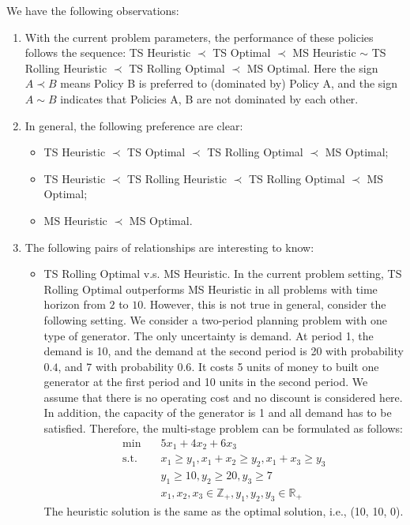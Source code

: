 \documentclass[10pt]{article}
\theoremstyle{plain}
\theoremstyle{definition}
\theoremstyle{remark}
\newcommand{\Z}{\mathbb{Z}}
\newcommand{\R}{\mathbb{R}}
\begin{document}
We have the following observations:
\begin{enumerate}[label=\emph{\alph*)}]
\item With the current problem parameters, the performance of these policies follows the sequence:
{\color{rred}TS Heuristic $\prec$ TS Optimal $\prec$ MS Heuristic $\sim$ TS Rolling Heuristic $\prec$ TS Rolling Optimal $\prec$ MS Optimal}.
Here the sign $A \prec B$ means Policy B is preferred to (dominated by) Policy A,
and the sign $A \sim B$ indicates that Policies A, B are not dominated by each other.
\item In general, the following preference are clear:
\begin{itemize}
\item {\color{rred}TS Heuristic $\prec$ TS Optimal $\prec$ TS Rolling Optimal $\prec$ MS Optimal};
\item {\color{ggreen}TS Heuristic $\prec$ TS Rolling Heuristic $\prec$ TS Rolling Optimal $\prec$ MS Optimal};
\item {\color{bblue}MS Heuristic $\prec$ MS Optimal}.
\end{itemize}
\item The following pairs of relationships are interesting to know:
\begin{itemize}
\item {\color{rred}TS Rolling Optimal v.s. MS Heuristic.}
In the current problem setting, TS Rolling Optimal outperforms MS Heuristic in all problems with time
horizon from $2$ to $10$. However, this is not true in general, consider the following setting.
We consider a two-period planning problem with one type of generator. The only uncertainty is demand.
At period 1, the demand is 10, and the demand at the second period is 20 with probability $0.4$, and 7 with probability $0.6$.
It costs 5 units of money to built one generator at the first period and 10 units in the second period.
We assume that there is no operating cost and no discount is considered here.
In addition, the capacity of the generator is 1 and all demand has to be satisfied.
Therefore, the multi-stage problem can be formulated as follows:
\begin{align*}
\min \quad & 5x_1 + 4x_2 + 6x_3\\
\text{s.t.} \quad & x_1 \ge y_1, x_1+x_2 \ge y_2, x_1 + x_3 \ge y_3\\
& y_1 \ge 10, y_2 \ge 20, y_3 \ge 7\\
& x_1, x_2, x_3\in \Z_+, y_1, y_2, y_3 \in \R_+
\end{align*}
The heuristic solution is the same as the optimal solution, i.e., (10, 10, 0).

\end{itemize}
\end{enumerate}
\end{document}
